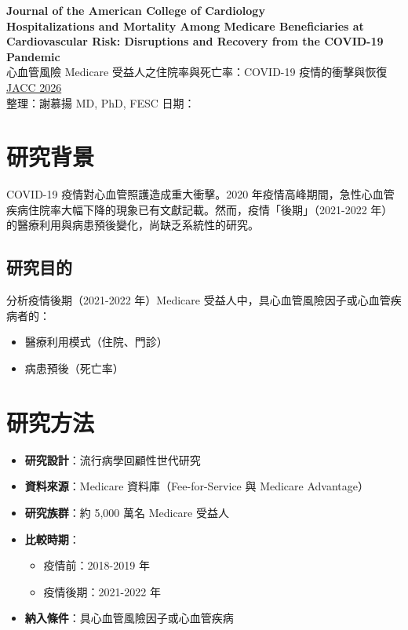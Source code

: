 \documentclass[12pt,a4paper]{article}
\begin{document}
\begin{center}
{\LARGE\bfseries\textcolor{emergency_red}{Journal of the American College of Cardiology}}\\[0.5cm]
{\Large\textbf{Hospitalizations and Mortality Among Medicare Beneficiaries at Cardiovascular Risk: Disruptions and Recovery from the COVID-19 Pandemic}}\\[0.3cm]
{\large 心血管風險 Medicare 受益人之住院率與死亡率：COVID-19 疫情的衝擊與恢復}\\[0.5cm]
{\normalsize \href{https://www.jacc.org}{JACC 2026}}\\[0.3cm]
{\normalsize 整理：謝慕揚 MD, PhD, FESC \quad 日期：\mydate}
\end{center}

\vspace{0.5cm}

\section{研究背景}

COVID-19 疫情對心血管照護造成重大衝擊。2020 年疫情高峰期間，急性心血管疾病住院率大幅下降的現象已有文獻記載。然而，疫情「後期」（2021-2022 年）的醫療利用與病患預後變化，尚缺乏系統性的研究。

\subsection{研究目的}
分析疫情後期（2021-2022 年）Medicare 受益人中，具心血管風險因子或心血管疾病者的：
\begin{itemize}
    \item 醫療利用模式（住院、門診）
    \item 病患預後（死亡率）
\end{itemize}

\section{研究方法}

\begin{itemize}
    \item \textbf{研究設計}：流行病學回顧性世代研究
    \item \textbf{資料來源}：Medicare 資料庫（Fee-for-Service 與 Medicare Advantage）
    \item \textbf{研究族群}：約 5,000 萬名 Medicare 受益人
    \item \textbf{比較時期}：
    \begin{itemize}
        \item 疫情前：2018-2019 年
        \item 疫情後期：2021-2022 年
    \end{itemize}
    \item \textbf{納入條件}：具心血管風險因子或心血管疾病
\end{itemize}
\end{document}
